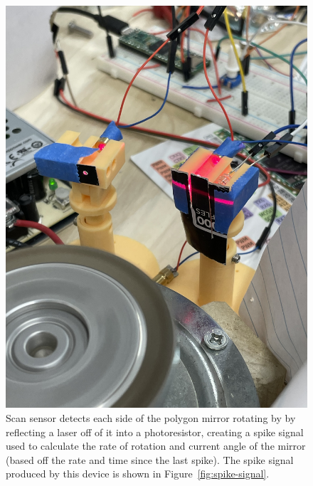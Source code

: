 \documentclass[twocolumn]{revtex4-2}
\begin{document}
\begin{figure}
    \centering
    \includegraphics[angle=270,width=0.95\linewidth]{scan-sensor.jpeg}
    \caption[Scan Sensor]{Scan sensor detects each side of the polygon mirror rotating by by reflecting a laser off of it into a photoresistor, creating a spike signal used to calculate the rate of rotation and current angle of the mirror (based off the rate and time since the last spike). The spike signal produced by this device is shown in Figure~\ref{fig:spike-signal}.}
    \label{fig:scan-sensor}
\end{figure}
\end{document}
